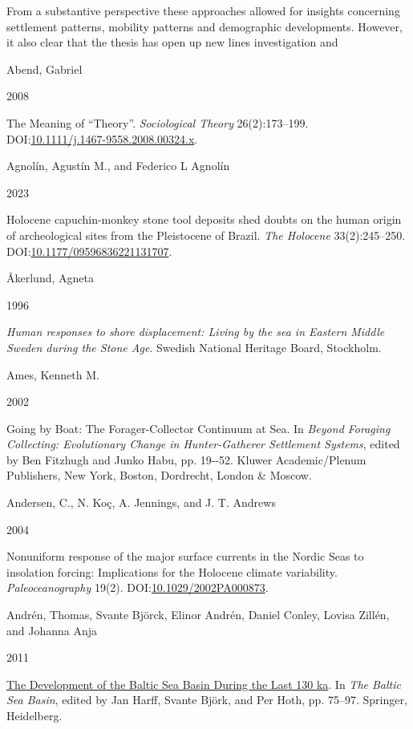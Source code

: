\documentclass[
  12pt,
  a4paper,
  oneside]{book}
\newlength{\cslhangindent}
\newlength{\csllabelwidth}
\newlength{\cslentryspacingunit} %
\newenvironment{CSLReferences}[2] %
 {%
  \setlength{\parindent}{0pt}
  \ifodd #1
  \let\oldpar\par
  \def\par{\hangindent=\cslhangindent\oldpar}
  \fi
  \setlength{\parskip}{#2\cslentryspacingunit}
 }%
 {}
\newcommand{\CSLBlock}[1]{#1\hfill\break}
\newcommand{\CSLLeftMargin}[1]{\parbox[t]{\csllabelwidth}{#1}}
\newcommand{\CSLRightInline}[1]{\parbox[t]{\linewidth - \csllabelwidth}{#1}\break}
\begin{document}
From a substantive perspective these approaches allowed for insights concerning settlement patterns, mobility patterns and demographic developments. However, it also clear that the thesis has open up new lines investigation and

\newpage

\hypertarget{refs}{}
\begin{CSLReferences}{0}{0}
\leavevmode{}%
\CSLBlock{Abend, Gabriel}
\CSLLeftMargin{ 2008}%
\CSLRightInline{{The Meaning of {``Theory''}}. \emph{Sociological Theory} 26(2):173--199. DOI:\href{https://doi.org/10.1111/j.1467-9558.2008.00324.x}{10.1111/j.1467-9558.2008.00324.x}.}

\leavevmode{}%
\CSLBlock{Agnolín, Agustín M., and Federico L Agnolín}
\CSLLeftMargin{ 2023}%
\CSLRightInline{{Holocene capuchin-monkey stone tool deposits shed doubts on the human origin of archeological sites from the Pleistocene of Brazil}. \emph{The Holocene} 33(2):245--250. DOI:\href{https://doi.org/10.1177/09596836221131707}{10.1177/09596836221131707}.}

\leavevmode{}%
\CSLBlock{Åkerlund, Agneta}
\CSLLeftMargin{ 1996}%
\CSLRightInline{\emph{{Human responses to shore displacement: Living by the sea in Eastern Middle Sweden during the Stone Age}}. Swedish National Heritage Board, Stockholm.}

\leavevmode{}%
\CSLBlock{Ames, Kenneth M.}
\CSLLeftMargin{ 2002}%
\CSLRightInline{{Going by Boat: The Forager-Collector Continuum at Sea}. In \emph{{Beyond Foraging Collecting: Evolutionary Change in Hunter-Gatherer Settlement Systems}}, edited by Ben Fitzhugh and Junko Habu, pp. 19-\/-52. Kluwer Academic/Plenum Publishers, New York, Boston, Dordrecht, London \& Moscow.}

\leavevmode{}%
\CSLBlock{Andersen, C., N. Koç, A. Jennings, and J. T. Andrews}
\CSLLeftMargin{ 2004}%
\CSLRightInline{{Nonuniform response of the major surface currents in the Nordic Seas to insolation forcing: Implications for the Holocene climate variability}. \emph{Paleoceanography} 19(2). DOI:\href{https://doi.org/10.1029/2002PA000873}{10.1029/2002PA000873}.}

\leavevmode{}%
\CSLBlock{Andrén, Thomas, Svante Björck, Elinor Andrén, Daniel Conley, Lovisa Zillén, and Johanna Anja}
\CSLLeftMargin{ 2011}%
\CSLRightInline{\href{https://doi.org/10.1007/978-3-642-17220-5_4}{{The Development of the Baltic Sea Basin During the Last 130 ka}}. In \emph{{The Baltic Sea Basin}}, edited by Jan Harff, Svante Björk, and Per Hoth, pp. 75--97. Springer, Heidelberg.}


\end{CSLReferences}
\end{document}

